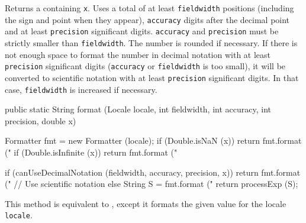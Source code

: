 \begin{tabb}
   Returns a  containing \texttt{x}.  Uses a total of at least
   \texttt{fieldwidth} positions (including the sign and point when they appear),
   \texttt{accuracy} digits after the decimal point and at least \texttt{precision}
   significant digits. \texttt{accuracy} and \texttt{precision} must be strictly
   smaller than \texttt{fieldwidth}. The number is rounded if necessary.
   If there is not enough space to format the number in decimal notation
   with at least \texttt{precision} significant digits (\texttt{accuracy} or
   \texttt{fieldwidth} is too small), it will be converted to scientific
   notation with at least \texttt{precision} significant digits.
   In that case, \texttt{fieldwidth} is increased if necessary.
  \end{tabb}
\begin{htmlonly}
\end{htmlonly}
\begin{code}

   public static String format (Locale locale, int fieldwidth, int accuracy,
                                int precision, double x)\begin{hide} {
         Formatter fmt = new Formatter (locale);
        if (Double.isNaN (x))
           return fmt.format ("%
        if (Double.isInfinite (x))
           return fmt.format ("%

       if (canUseDecimalNotation (fieldwidth, accuracy, precision, x))
          return fmt.format ("%
       // Use scientific notation
       else {
          String S = fmt.format ("%
          return processExp (S);
       }
   }\end{hide}
\end{code}
\begin{tabb}
  This method is equivalent to
  , except it formats the given
  value for the locale \texttt{locale}.
    \end{tabb}
\begin{htmlonly}
\end{htmlonly}
